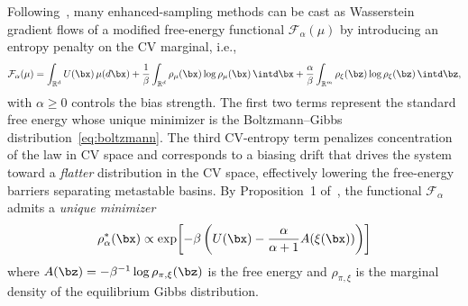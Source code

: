 \documentclass[a4paper,fleqn]{cas-sc}
\theoremstyle{definition}
\begin{document}
Following~\cite{lelievre2025convergence}, many enhanced-sampling methods can be cast as Wasserstein gradient flows of a modified free-energy functional $\mathcal F_\alpha(\mu)$ by introducing an entropy penalty on the CV marginal, i.e., 
\begin{equation}
\mathcal F_\alpha(\mu)
=
\int_{\mathbb R^d} U(\bx)\,\mu(d\bx)
+
\frac{1}{\beta}
\int_{\mathbb R^d}
\rho_\mu(\bx)\log\rho_\mu(\bx)\, \intd\bx
+
\frac{\alpha}{\beta}
\int_{\mathbb R^m}
\rho_{\xi}(\bz)\log\rho_{\xi}(\bz)\,\intd\bz, 
\nonumber
\end{equation}
with \(\alpha\ge 0\) controls the bias strength. 
The first two terms represent the standard free energy whose unique minimizer is the Boltzmann--Gibbs distribution~\eqref{eq:boltzmann}.
The third CV-entropy term penalizes concentration of the law in CV space and corresponds to a biasing drift that drives the system toward a \emph{flatter} distribution in the CV space, effectively lowering the free-energy barriers separating metastable basins.
By Proposition~1 of~\cite{lelievre2025convergence}, the functional $\mathcal{F}_\alpha$ admits a \emph{unique minimizer}
\[
\rho_\alpha^*(\bx)
\propto
\exp\!\left[
-\beta\left(
U(\bx)-\frac{\alpha}{\alpha+1}A(\xi(\bx))
\right)
\right]
\]
where $A(\bz) =-\beta^{-1}\log \rho_{\pi,\xi}(\bz)$ is the free energy and $\rho_{\pi,\xi}$ is the marginal density of the equilibrium Gibbs distribution. 
\end{document}
